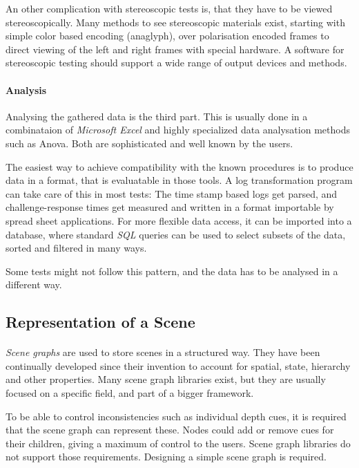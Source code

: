 An other complication with stereoscopic tests is, that they have to be viewed stereoscopically.
Many methods to see stereoscopic materials exist, starting with simple color based encoding (anaglyph), over polarisation encoded frames to direct viewing of the left and right frames with special hardware.
A software for stereoscopic testing should support a wide range of output devices and methods.

\paragraph{Analysis}
Analysing the gathered data is the third part. This is usually done in a combinataion of \textit{Microsoft Excel} and highly specialized data analysation methods such as Anova. Both are sophisticated and well known by the users.

The easiest way to achieve compatibility with the known procedures is to produce data in a format, that is evaluatable in those tools. A log transformation program can take care of this in most tests: The time stamp based logs get parsed, and challenge-response times get measured and written in a format importable by spread sheet applications.
For more flexible data access, it can be imported into a database, where standard \textit{SQL} queries can be used to select subsets of the data, sorted and filtered in many ways.

Some tests might not follow this pattern, and the data has to be analysed in a different way.


\subsection{Representation of a Scene\label{sceneRep}}
\paragraph{}
\textit{Scene graphs} are used to store scenes in a structured way. They have been continually developed since their invention\cite{scenegraph} to account for spatial, state, hierarchy and other properties.
Many scene graph libraries exist, but they are usually focused on a specific field, and part of a bigger framework.

To be able to control inconsistencies such as individual depth cues, it is required that the scene graph can represent these. Nodes could add or remove cues for their children, giving a maximum of control to the users. Scene graph libraries do not support those requirements. Designing a simple scene graph is required.

